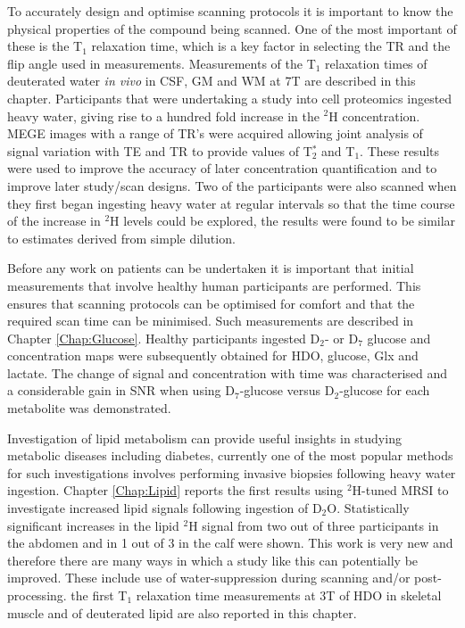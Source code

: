 To accurately design and optimise scanning protocols it is important to know the physical properties of the compound being scanned. One of the most important of these is the T$_1$ relaxation time, which is a key factor in selecting the \ac{TR} and the flip angle used in measurements. Measurements of the T$_1$ relaxation times of deuterated water \textit{in vivo} in \ac{CSF}, \ac{GM} and \ac{WM} at 7T are described in this chapter. Participants that were undertaking a study into cell proteomics ingested heavy water, giving rise to a hundred fold increase in the $^2$H concentration. \ac{MEGE} images with a range of \ac{TR}'s were acquired allowing joint analysis of signal variation with \ac{TE} and \ac{TR} to provide values of T$_2^*$ and T$_1$. These results were used to improve the accuracy of later concentration quantification and to improve later study/scan designs. Two of the participants were also scanned when they first began ingesting heavy water at regular intervals so that the time course of the increase in $^2$H levels could be explored, the results were found to be similar to estimates derived from simple dilution.

Before any work on patients can be undertaken it is important that initial measurements that involve healthy human participants are performed. This ensures that scanning protocols can be optimised for comfort and that the required scan time can be minimised. Such measurements are described in Chapter \ref{Chap:Glucose}. Healthy participants ingested D$_2$- or D$_7$ glucose and concentration maps were subsequently obtained for \ac{HDO}, glucose, Glx and lactate. The change of signal and concentration with time was characterised and a considerable gain in \ac{SNR} when using D$_7$-glucose versus D$_2$-glucose for each metabolite was demonstrated.

Investigation of lipid metabolism can provide useful insights in studying metabolic diseases including diabetes, currently one of the most popular methods for such investigations involves performing invasive biopsies following heavy water ingestion. Chapter \ref{Chap:Lipid} reports the first results using $^2$H-tuned MRSI to investigate increased lipid signals following ingestion of D$_2$O. Statistically significant increases in the lipid $^2$H signal from two out of three participants in the abdomen and in 1 out of 3 in the calf were shown. This work is very new and therefore there are many ways in which a study like this can potentially be improved. These include use of water-suppression during scanning and/or post-processing. the first T$_1$ relaxation time measurements at 3T of \ac{HDO} in skeletal muscle and of deuterated lipid are also reported in this chapter.

